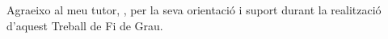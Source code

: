 
\begin{acknowledgements}
\addchaptertocentry{\acknowledgementname}

Agraeixo al meu tutor, \supnameA, per la seva orientació i suport durant
la realització d'aquest Treball de Fi de Grau.

\end{acknowledgements}

